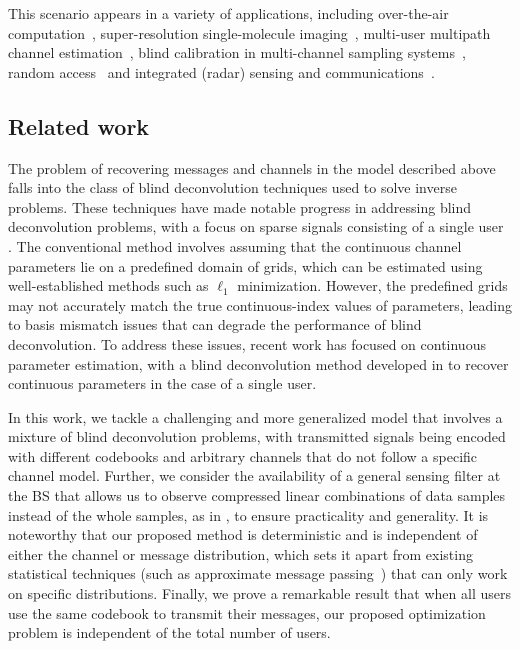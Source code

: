 \documentclass[conference,10pt]{IEEEtran}
\theoremstyle{remark}
\theoremstyle{plain}
\theoremstyle{definition}
\theoremstyle{remark}
\begin{document}
This scenario appears in a variety of applications, including over-the-air computation~\cite{SaeedBlind2022,razavikia2023computing}, super-resolution single-molecule imaging~\cite{three-dimensionalsuper,SaeedBinary2020,razavikia2019sampling,maskan2023demixing,valiulahi2019two},  multi-user multipath channel estimation~\cite{jung2017blind,daei2023blind}, blind calibration in multi-channel sampling systems~\cite{vetterli2010multichannel,SayyariBlind2021}, random access~\cite{daei2023blinda} and integrated (radar) sensing and communications~\cite{liu2020joint,seidi2022novel,safari2021off}. 
  


\subsection{Related work}

The problem of recovering messages and channels in the model described above falls into the class of blind deconvolution techniques used to solve inverse problems. These techniques have made notable progress in addressing blind deconvolution problems, with a focus on sparse signals consisting of a single user \cite{jain2017non,ahmed2013blind,ling2015self,candes2013phaselift,daei2019distribution}. The conventional method involves assuming that the continuous channel parameters lie on a predefined domain of grids, which can be estimated using well-established methods such as $\ell_1$ minimization. However, the predefined grids may not accurately match the true continuous-index values of parameters, leading to basis mismatch issues that can degrade the performance of blind deconvolution. To address these issues, recent work has focused on continuous parameter estimation, with a blind deconvolution method developed in \cite{chi2016guaranteed} to recover continuous parameters in the case of a single user.

In this work, we tackle a challenging and more generalized model that involves a mixture of blind deconvolution problems, with transmitted signals being encoded with different codebooks and arbitrary channels that do not follow a specific channel model. Further, we consider the availability of a general sensing filter at the \ac{BS} that allows us to observe compressed linear combinations of data samples instead of the whole samples, as in \cite{Jacome2020DualBlind}, to ensure practicality and generality. It is noteworthy that our proposed method is deterministic and is independent of either the channel or message distribution, which sets it apart from existing statistical techniques (such as approximate message passing~\cite{ke2020compressive}) that can only work on specific distributions. Finally, we prove a remarkable result that when all users use the same codebook to transmit their messages, our proposed optimization problem is independent of the total number of users.   
\end{document}
